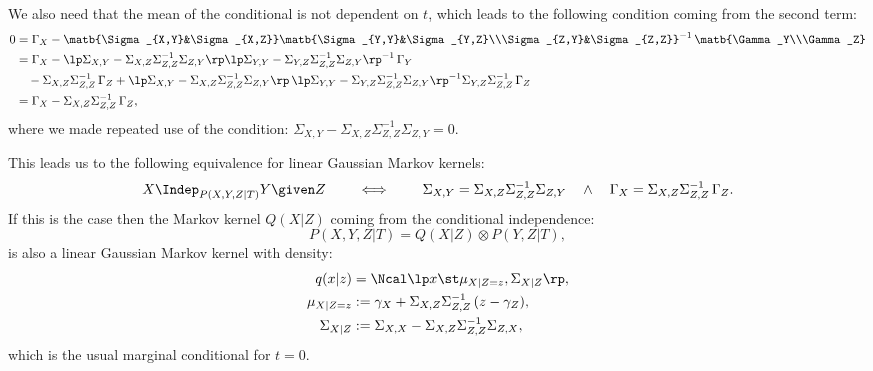 We also need that the mean of the conditional is not dependent on $t$, which leads to the following condition coming from the second term:
\begin{align*}
    0 & = \Gamma_X -  \matb{\Sigma_{X,Y}&\Sigma_{X,Z}} \matb{\Sigma_{Y,Y}&\Sigma_{Y,Z}\\\Sigma_{Z,Y}&\Sigma_{Z,Z}}^{-1}\,\matb{\Gamma_Y\\\Gamma_Z} \\
    & =  \Gamma_X - \lp \Sigma_{X,Y} -\Sigma_{X,Z} \Sigma_{Z,Z}^{-1}\Sigma_{Z,Y} \rp \lp\Sigma_{Y,Y}-\Sigma_{Y,Z}\Sigma_{Z,Z}^{-1}\Sigma_{Z,Y}\rp^{-1} \, \Gamma_Y \\
    & \quad -  \Sigma_{X,Z}  \Sigma_{Z,Z}^{-1} \, \Gamma_Z 
 + \lp \Sigma_{X,Y} - \Sigma_{X,Z} \Sigma_{Z,Z}^{-1}\Sigma_{Z,Y}\rp\,\lp\Sigma_{Y,Y}-\Sigma_{Y,Z}\Sigma_{Z,Z}^{-1}\Sigma_{Z,Y}\rp^{-1} \Sigma_{Y,Z}\Sigma_{Z,Z}^{-1} \, \Gamma_Z \\
 &= \Gamma_X - \Sigma_{X,Z}\Sigma_{Z,Z}^{-1}\,\Gamma_Z,
\end{align*}
where we made repeated use of the condition: $\Sigma_{X,Y} - \Sigma_{X,Z} \Sigma_{Z,Z}^{-1}\Sigma_{Z,Y} =0$.


This leads us to the following equivalence for linear Gaussian Markov kernels:
\[X \Indep_{P(X,Y,Z|T)} Y \given Z \qquad \iff \qquad \Sigma_{X,Y} = \Sigma_{X,Z} \Sigma_{Z,Z}^{-1}\Sigma_{Z,Y} 
\quad \land \quad \Gamma_X = \Sigma_{X,Z}\Sigma_{Z,Z}^{-1}\,\Gamma_Z. \]
If this is the case then the Markov kernel $Q(X|Z)$ coming from the conditional independence:
\[P(X,Y,Z|T) = Q(X|Z) \otimes P(Y,Z|T),\]
is also a linear Gaussian Markov kernel
with density:
\begin{align*}
    q(x|z) &= \Ncal\lp x \st \mu_{X|Z=z}, \Sigma_{X|Z} \rp,\\ 
    \mu_{X|Z=z}   &:= \gamma_X + \Sigma_{X,Z}\Sigma_{Z,Z}^{-1}\, (z-\gamma_Z),\\
    \Sigma_{X|Z} & := \Sigma_{X,X} - \Sigma_{X,Z}\Sigma_{Z,Z}^{-1} \Sigma_{Z,X},
\end{align*}
which is the usual marginal conditional for $t=0$.





